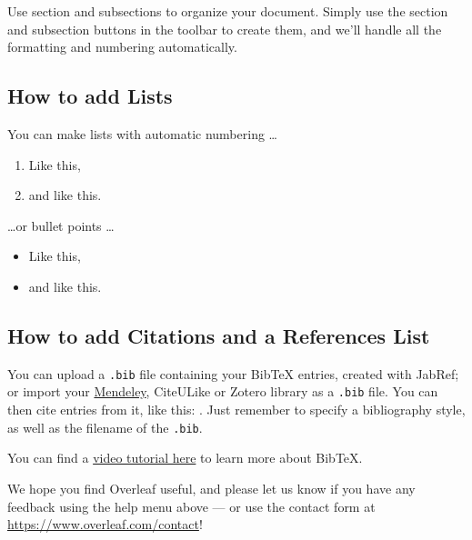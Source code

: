 \documentclass[a4paper]{article}
\begin{document}
Use section and subsections to organize your document. Simply use the section and subsection buttons in the toolbar to create them, and we'll handle all the formatting and numbering automatically.

\subsection{How to add Lists}

You can make lists with automatic numbering \dots

\begin{enumerate}
\item Like this,
\item and like this.
\end{enumerate}
\dots or bullet points \dots
\begin{itemize}
\item Like this,
\item and like this.
\end{itemize}

\subsection{How to add Citations and a References List}

You can upload a \verb|.bib| file containing your BibTeX entries, created with JabRef; or import your \href{https://www.overleaf.com/blog/184}{Mendeley}, CiteULike or Zotero library as a \verb|.bib| file. You can then cite entries from it, like this: \cite{greenwade93}. Just remember to specify a bibliography style, as well as the filename of the \verb|.bib|.

You can find a \href{https://www.overleaf.com/help/97-how-to-include-a-bibliography-using-bibtex}{video tutorial here} to learn more about BibTeX.

We hope you find Overleaf useful, and please let us know if you have any feedback using the help menu above --- or use the contact form at \url{https://www.overleaf.com/contact}!




\end{document}
